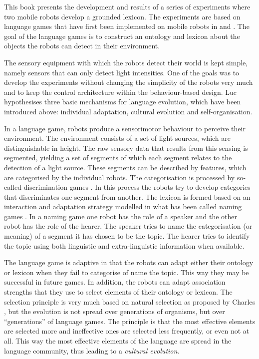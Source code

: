 This book presents the development and results of a series of experiments where two mobile robots develop a grounded lexicon. The experiments are based on language games that have first been implemented on mobile robots in \citet{steelsvogt:1997} and \citet{vogt:1997}. The goal of the language games is to construct an ontology and lexicon about the objects the robots can detect in their environment.



The sensory equipment with which the robots detect their world is kept simple, namely sensors that can only detect light intensities. One of the goals was to develop the experiments without changing the simplicity of the robots very much and to keep the control architecture within the behaviour-based design. Luc \citet{steels:1996a} hypothesises three basic mechanisms for language evolution, which have been introduced above: individual adaptation, cultural evolution and self-organisation. 

In a language game, robots produce a sensorimotor behaviour to perceive their environment. The environment consists of a set of light sources, which are distinguishable in height. The raw sensory data that results from this sensing is segmented, yielding a set of segments of which each segment relates to the detection of a light source. These segments can be described by features, which are categorised by the individual robots. The categorisation is processed by so-called {\sc discrimination games} \citep{steels:1996b}. In this process the robots try to develop categories that discriminates one segment from another. The lexicon is formed based on an interaction and adaptation strategy modelled in what has been called {\sc naming games} \citep{steels:1996a}. In a naming game one robot has the role of a speaker and the other robot has the role of the hearer. The speaker tries to name the categorisation (or meaning) of a segment it has chosen to be the topic. The hearer tries to identify the topic using both linguistic and extra-linguistic information when available.


The language game is adaptive in that the robots can adapt either their ontology or lexicon when they fail to categorise of name the topic. This way they may be successful in future games. In addition, the robots can adapt association strengths that they use to select elements of their ontology or lexicon. The selection principle is very much based on natural selection as proposed by Charles \citet{darwin:1968}, but the evolution is not  spread over generations of organisms, but over ``generations'' of language games. The principle is that the most effective elements are selected more and ineffective ones are selected less frequently, or even not at all. This way the most effective elements of the language are spread in the language community, thus leading to a {\em cultural evolution}.


